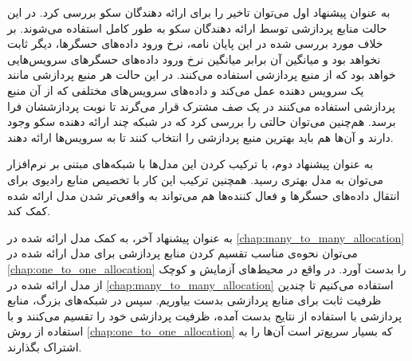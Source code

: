    به عنوان پیشنهاد اول می‌توان تاخیر را برای ارائه دهندگان سکو بررسی کرد.
    در این حالت منابع پردازشی توسط ارائه دهندگان سکو به طور کامل استفاده می‌شوند.
    بر خلاف مورد بررسی شده در این پایان نامه، نرخ ورود داده‌های حسگر‌ها، دیگر ثابت نخواهد بود و میانگین آن برابر میانگین نرخ ورود داده‌های حسگر‌های سرویس‌هایی خواهد بود که از منبع پردازشی استفاده می‌کنند.
    در این حالت هر منبع پردازشی مانند یک سرویس دهنده عمل می‌کند و داده‌های سرویس‌های مختلفی که از آن منبع پردازشی استفاده می‌کنند در یک صف مشترک قرار می‌گرند تا نوبت پردازششان فرا برسد.
    هم‌چنین می‌توان حالتی را بررسی کرد که در شبکه چند ارائه دهنده سکو وجود دارند و آن‌ها هم باید بهترین منبع پردازشی را انتخاب کنند تا به سرویس‌ها ارائه دهند.

    به عنوان پیشنهاد دوم، با ترکیب کردن این مدل‌ها با شبکه‌های مبتنی بر نرم‌افزار می‌توان به مدل بهتری رسید.
    همچنین ترکیب این کار با تخصیص منابع رادیوی برای انتقال داده‌های حسگر‌ها و فعال کننده‌ها هم می‌تواند به واقعی‌تر شدن مدل ارائه شده کمک کند.

    به عنوان پیشنهاد آخر، به کمک مدل ارائه شده در \cref{chap:many_to_many_allocation} می‌توان نحوه‌ی مناسب تقسیم کردن منابع پردازشی برای مدل ارائه شده در \cref{chap:one_to_one_allocation} را بدست آورد.
    در واقع در محیط‌های آزمایش و کوچک از مدل ارائه شده در \cref{chap:many_to_many_allocation} استفاده می‌کنیم تا چندین ظرفیت ثابت برای منابع پردازشی بدست بیاوریم. سپس در شبکه‌های بزرگ، منابع پردازشی با استفاده از نتایج بدست آمده، ظرفیت پردازشی خود را تقسیم می‌کنند و با استفاده از روش \cref{chap:one_to_one_allocation} که بسیار سریع‌تر است آن‌ها را به اشتراک بگذارند.